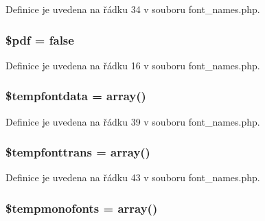 Definice je uvedena na řádku 34 v souboru font\-\_\-names.\-php.

\hypertarget{font__names_8php_a964ee5ee597c515cbb4dad2f14054cb4}{
\subsubsection[{\$pdf}]{\setlength{\rightskip}{0pt plus 5cm}\$pdf = {\bf false}}}\label{font__names_8php_a964ee5ee597c515cbb4dad2f14054cb4}


Definice je uvedena na řádku 16 v souboru font\-\_\-names.\-php.

\hypertarget{font__names_8php_a47be5bc20842a7025769908c5470c016}{
\subsubsection[{\$tempfontdata}]{\setlength{\rightskip}{0pt plus 5cm}\$tempfontdata = array()}}\label{font__names_8php_a47be5bc20842a7025769908c5470c016}


Definice je uvedena na řádku 39 v souboru font\-\_\-names.\-php.

\hypertarget{font__names_8php_aed2e1668920a2587b53972478bb38bfe}{
\subsubsection[{\$tempfonttrans}]{\setlength{\rightskip}{0pt plus 5cm}\$tempfonttrans = array()}}\label{font__names_8php_aed2e1668920a2587b53972478bb38bfe}


Definice je uvedena na řádku 43 v souboru font\-\_\-names.\-php.

\hypertarget{font__names_8php_afc42e5925d18d7f0564c12391e5ef71c}{
\subsubsection[{\$tempmonofonts}]{\setlength{\rightskip}{0pt plus 5cm}\$tempmonofonts = array()}}\label{font__names_8php_afc42e5925d18d7f0564c12391e5ef71c}


